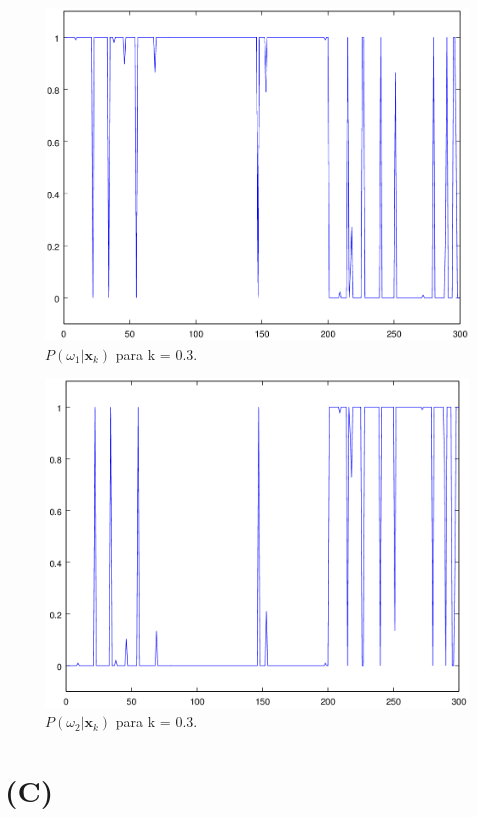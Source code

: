 \documentclass[12pt,twoside]{report}
\newcommand{\captiontext}[1]{\small{#1}}
\begin{document}
\begin{figure}[H]
    \centering
    \includegraphics[scale=0.35]{parzen-h03-pw1}
    \caption{\captiontext{$P(\omega_1|\mathbf{x}_k)$ para k = 0.3.}}
    \label{fig:parzen-h03-pw1}
\end{figure}

\begin{figure}[H]
    \centering
    \includegraphics[scale=0.35]{parzen-h03-pw2}
    \caption{\captiontext{$P(\omega_2|\mathbf{x}_k)$ para k = 0.3.}}
    \label{fig:parzen-h03-pw2}
\end{figure}

\section*{(C)}
\end{document}

